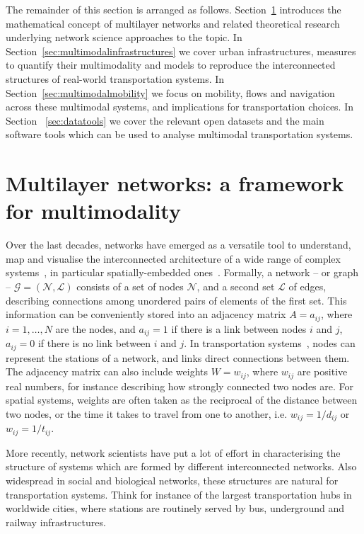The remainder of this section is arranged as follows. Section~\ref{sec:multilayernetworks} introduces the mathematical concept of multilayer networks and related theoretical research underlying network science approaches to the topic. In Section~\ref{sec:multimodalinfrastructures} we cover urban infrastructures, measures to quantify their multimodality and models to reproduce the interconnected structures of real-world transportation systems. In Section~\ref{sec:multimodalmobility} we focus on mobility, flows and navigation across these multimodal systems, and implications for transportation choices. In Section ~\ref{sec:datatools} we cover the relevant open datasets and the main software tools which can be used to analyse multimodal transportation systems. %

\section{Multilayer networks: a framework for multimodality}\label{sec:multilayernetworks}

Over the last decades, networks have emerged as a versatile tool to understand, map and visualise the interconnected architecture of a wide range of complex systems~\cite{albert2002statistical,dorogovtsev2002evolution, newman2003structure, boccaletti2006complex}, in particular spatially-embedded ones~\cite{barthelemy2011spatial}. Formally, a network -- or graph -- $\mathcal G = (\mathcal N, \mathcal L)$ consists of a set of nodes $\mathcal N$, and a second set $\mathcal L$ of edges, describing connections among unordered pairs of elements of the first set. This information can be conveniently stored into an adjacency matrix ${A=a_{ij}}$, where $i=1, \dots, N$ are the nodes, and $a_{ij}=1$ if there is a link between nodes $i$ and $j$, $a_{ij}=0$ if there is no link between $i$ and $j$. In transportation systems~\cite{lin2013complex}, nodes can represent the stations of a network, and links direct connections between them. The adjacency matrix can also include weights $W=w_{ij}$, where $w_{ij}$ are positive real numbers, for instance describing how strongly connected two nodes are. For spatial systems, weights are often taken as the reciprocal of the distance between two nodes, or the time it takes to travel from one to another, i.e. $w_{ij}=1/d_{ij}$ or $w_{ij}=1/t_{ij}$.

More recently, network scientists have put a lot of effort in characterising the structure of systems which are formed by different interconnected networks. Also widespread in social and biological networks, these structures are natural for transportation systems. Think for instance of the largest transportation hubs in worldwide cities, where stations are routinely served by bus, underground and railway infrastructures.

